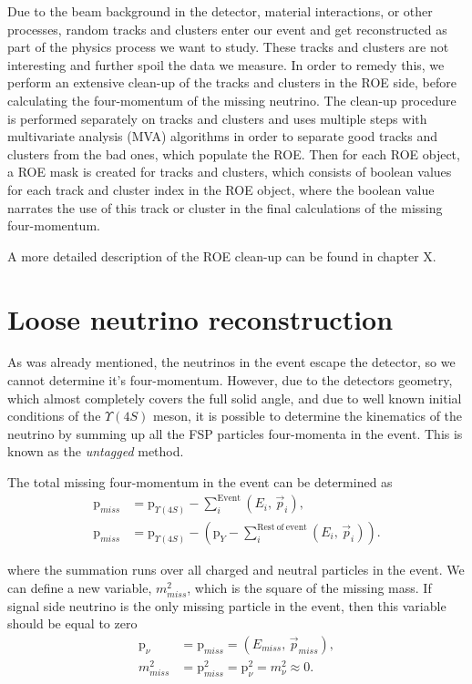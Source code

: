 \documentclass[oneside,a4paper,openany,12pt]{scrbook}
\begin{document}
Due to the beam background in the detector, material interactions, or other processes, random tracks and clusters enter our event and get reconstructed as part of the physics process we want to study. These tracks and clusters are not interesting and further spoil the data we measure. In order to remedy this, we perform an extensive clean-up of the tracks and clusters in the ROE side, before calculating the four-momentum of the missing neutrino. The clean-up procedure is performed separately on tracks and clusters and uses multiple steps with multivariate analysis (MVA) algorithms in order to separate good tracks and clusters from the bad ones, which populate the ROE. Then for each ROE object, a ROE mask is created for tracks and clusters, which consists of boolean values for each track and cluster index in the ROE object, where the boolean value narrates the use of this track or cluster in the final calculations of the missing four-momentum.

A more detailed description of the ROE clean-up can be found in chapter X.

\section{Loose neutrino reconstruction}

As was already mentioned, the neutrinos in the event escape the detector, so we cannot determine it's four-momentum. However, due to the detectors geometry, which almost completely covers the full solid angle, and due to well known initial conditions of the $\Upsilon(4S)$ meson, it is possible to determine the kinematics of the neutrino by summing up all the FSP particles four-momenta in the event. This is known as the \textit{untagged} method.

The total missing four-momentum in the event can be determined as
\begin{align}
\mathrm{p}_{miss} &= \mathrm{p}_{\Upsilon(4S)} - \sum_i^{\mathrm{Event}}\left(E_i,\,\vec{p}_i \right),\\
\mathrm{p}_{miss} &= \mathrm{p}_{\Upsilon(4S)} - \left(\mathrm{p}_{Y} -\sum_i^{\mathrm{Rest~of~event}}\left(E_i,\,\vec{p}_i \right)\right).
\end{align}

where the summation runs over all charged and neutral particles in the event. We can define a new variable, $m_{miss}^2$, which is the square of the missing mass. If signal side neutrino is the only missing particle in the event, then this variable should be equal to zero
\begin{align}
\label{eq:nuold}
\mathrm{p}_\nu &= \mathrm{p}_{miss} = \left(E_{miss},\,\vec{p}_{miss} \right),\\
m_{miss}^2 &= \mathrm{p}_{miss}^2 = \mathrm{p}_{\nu}^2 = m_\nu^2 \approx 0.
\end{align}
\end{document}
